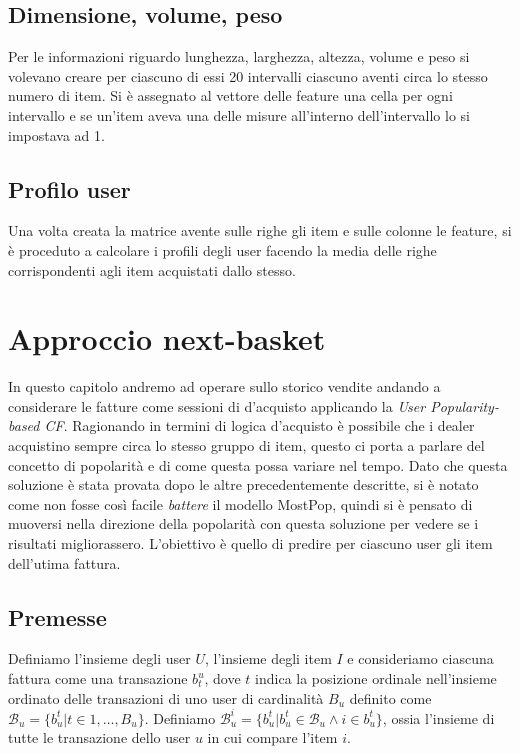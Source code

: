 \subsection{Dimensione, volume, peso}
Per le informazioni riguardo lunghezza, larghezza, altezza, volume e peso si volevano creare per ciascuno di essi 20 intervalli ciascuno aventi circa lo stesso numero di item. Si è assegnato al vettore delle feature una cella per ogni intervallo e se un'item aveva una delle misure all'interno dell'intervallo lo si impostava ad 1.

\subsection{Profilo user}
Una volta creata la matrice avente sulle righe gli item e sulle colonne le feature, si è proceduto a calcolare i profili degli user facendo la media delle righe corrispondenti agli item acquistati dallo stesso.

\section{Approccio next-basket}
In questo capitolo andremo ad operare sullo storico vendite andando a considerare le fatture come sessioni di d'acquisto applicando la \textit{User Popularity-based CF}.
Ragionando in termini di logica d'acquisto è possibile che i dealer acquistino sempre circa lo stesso gruppo di item, questo ci porta a parlare del concetto di popolarità e di come questa possa variare nel tempo.
Dato che questa soluzione è stata provata dopo le altre precedentemente descritte, si è notato come non fosse così facile \textit{battere} il modello MostPop, quindi si è pensato di muoversi nella direzione della popolarità con questa soluzione per vedere se i risultati migliorassero. L'obiettivo è quello di predire per ciascuno user gli item dell'utima fattura.

\subsection{Premesse}
Definiamo l'insieme degli user $U$, l'insieme degli item $I$ e consideriamo ciascuna fattura come una transazione $b_{t}^{u}$, dove $t$ indica la posizione ordinale nell'insieme ordinato delle transazioni di uno user di cardinalità $B_{u}$ definito come $\mathcal{B}_u = \{b_{u}^{t} | t \in 1, \dots, B_u\}$. Definiamo $\mathcal{B}_{u}^{i} = \{b_{u}^{t}|b_{u}^{t} \in \mathcal{B}_{u} \wedge i \in b_{u}^{t}\}$, ossia l'insieme di tutte le transazione dello user $u$ in cui compare l'item $i$.
